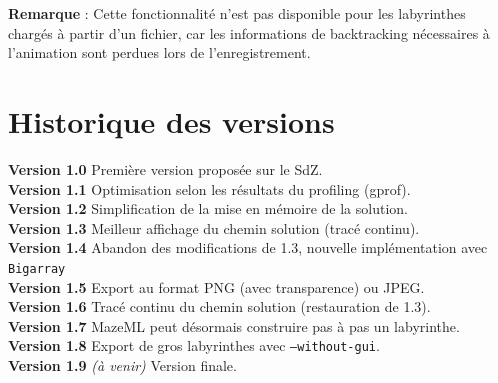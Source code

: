 \documentclass[11pt]{article}
\begin{document}
  \vspace{3mm}
  \textbf{Remarque} : Cette fonctionnalité n'est pas disponible pour les 
  labyrinthes chargés à partir d'un fichier, car les informations de 
  backtracking nécessaires à l'animation sont perdues lors de l'enregistrement.


    \section{Historique des versions}

\noindent\textbf{Version 1.0} Première version proposée sur le SdZ.           \\
\textbf{Version 1.1} Optimisation selon les résultats du profiling (gprof).   \\
\textbf{Version 1.2} Simplification de la mise en mémoire de la solution.     \\
\textbf{Version 1.3} Meilleur affichage du chemin solution (tracé continu).   \\
\textbf{Version 1.4} Abandon des modifications de 1.3, nouvelle implémentation 
                     avec \texttt{Bigarray}                                   \\
\textbf{Version 1.5} Export au format PNG (avec transparence) ou JPEG.        \\
\textbf{Version 1.6} Tracé continu du chemin solution (restauration de 1.3).  \\
\textbf{Version 1.7} MazeML peut désormais construire pas à pas un labyrinthe.\\
\textbf{Version 1.8} Export de gros labyrinthes avec \texttt{--without-gui}.  \\
\textbf{Version 1.9} \emph{(à venir)} Version finale.
\end{document}
